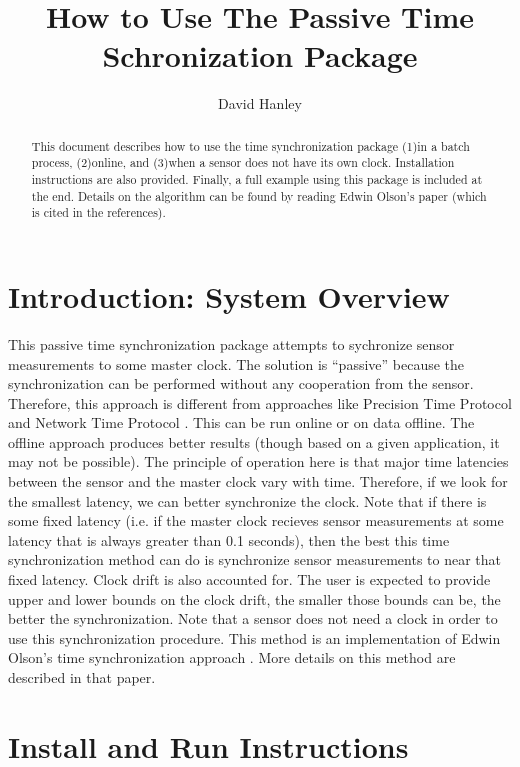 \documentclass[11pt,a4paper]{article}
\title{How to Use The Passive Time Schronization Package}
\author{David Hanley}
\begin{document}
\maketitle

\begin{abstract}
 This document describes how to use the time synchronization package (1)in a batch process, (2)online, and (3)when a sensor does not have its own clock. Installation instructions are also provided. Finally, a full example using this package is included at the end. Details on the algorithm can be found by reading Edwin Olson's paper (which is cited in the references).
\end{abstract}

\section{Introduction: System Overview}

This passive time synchronization package attempts to sychronize sensor measurements to some master clock. The solution is ``passive'' because the synchronization can be performed without any cooperation from the sensor. Therefore, this approach is different from approaches like Precision Time Protocol \cite{PTP:2008} and Network Time Protocol \cite{Mills:1991}. This can be run online or on data offline. The offline approach produces better results (though based on a given application, it may not be possible). The principle of operation here is that major time latencies between the sensor and the master clock vary with time. Therefore, if we look for the smallest latency, we can better synchronize the clock. Note that if there is some fixed latency (i.e. if the master clock recieves sensor measurements at some latency that is always greater than 0.1 seconds), then the best this time synchronization method can do is synchronize sensor measurements to near that fixed latency. Clock drift is also accounted for. The user is expected to provide upper and lower bounds on the clock drift, the smaller those bounds can be, the better the synchronization. Note that a sensor does not need a clock in order to use this synchronization procedure. This method is an implementation of Edwin Olson's time synchronization approach \cite{Olson:2010}. More details on this method are described in that paper.

\section{Install and Run Instructions}
\end{document}
